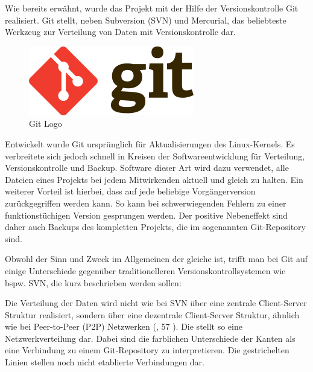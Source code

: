 Wie bereits erwähnt, wurde das Projekt mit der Hilfe der Versionskontrolle Git realisiert. Git stellt, neben \gls{Subversion} (SVN) und \gls{Mercurial}, das beliebteste Werkzeug zur Verteilung von Daten mit Versionskontrolle dar.

\begin{figure}
 \begin{center}
   \includegraphics[scale=0.5]{img/git_logo.png}
 \end{center}
 \caption[\textbf{Git Logo}\protect\newline Quelle: \url{http://upload.wikimedia.org/wikipedia/commons/thumb/e/e0/Git-logo.svg/273px-Git-logo.svg.png}]{Git Logo}
 \label{fig:git_logo}
\end{figure}
\newpage

Entwickelt wurde Git ursprünglich für Aktualisierungen des Linux-Kernels. Es verbreitete sich jedoch schnell in Kreisen der Softwareentwicklung für Verteilung, Versionskontrolle und Backup.
Software dieser Art wird dazu verwendet, alle Dateien eines Projekts bei jedem Mitwirkenden aktuell und gleich zu halten. Ein weiterer Vorteil ist hierbei, dass auf jede beliebige Vorgängerversion zurückgegriffen werden kann. So kann bei schwerwiegenden Fehlern zu einer funktionstüchigen Version gesprungen werden. Der positive Nebeneffekt sind daher auch Backups des kompletten Projekts, die im sogenannten Git-Repository sind. 

Obwohl der Sinn und Zweck im Allgemeinen der gleiche ist, trifft man bei Git auf einige Unterschiede gegenüber traditionelleren Versionskontrollsystemen wie bspw. SVN, die kurz beschrieben werden sollen:

Die Verteilung der Daten wird nicht wie bei SVN über eine zentrale Client-Server Struktur realisiert, sondern über eine dezentrale Client-Server Struktur, ähnlich wie bei \gls{Peer-to-Peer} (P2P) Netzwerken (\cite{MaSch-P2PN}, 57 ). Die  stellt so eine Netzwerkverteilung dar. Dabei sind die farblichen Unterschiede der Kanten als eine Verbindung zu einem Git-Repository zu interpretieren. Die gestrichelten Linien stellen noch nicht etablierte Verbindungen dar.

